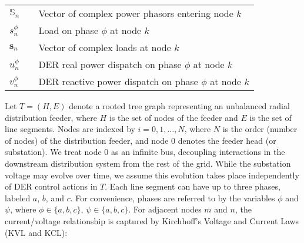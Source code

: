 \begin{table}[t]
\begin{center}
\begin{tabulary}{\textwidth}{LLL}
\noindent $\mathbb{S}_{n}$ & & Vector of complex power phasors entering node $k$ \\
\noindent $s_{n}^{\phi}$ & & Load on phase $\phi$ at node $k$ \\
\noindent $\mathbf{s}_{n}$ & & Vector of complex loads at node $k$ \\
\noindent $u_{n}^{\phi}$ & & DER real power dispatch on phase $\phi$ at node $k$ \\
\noindent $v_{n}^{\phi}$ & & DER reactive power dispatch on phase $\phi$ at node $k$ \\
  \hline
\end{tabulary}  
\end{center}
\end{table}

Let $T = (H,E)$ denote a rooted tree graph representing an unbalanced radial distribution feeder, where $H$ is the set of nodes of the feeder and $E$ is the set of line segments.  Nodes are indexed by $i = 0,1,\dots,N$, where $N$ is the order (number of nodes) of the distribution feeder, and node 0 denotes the feeder head (or substation).  We treat node 0 as an infinite bus, decoupling interactions in the downstream distribution system from the rest of the grid.  While the substation voltage may evolve over time, we assume this evolution takes place independently of DER control actions in $T$.  Each line segment can have up to three phases, labeled $a$, $b$, and $c$.  For convenience, phases are referred to by the variables $\phi$ and $\psi$, where $\phi \in \{a,b,c \}$, $\psi \in \{a,b,c \}$.  For adjacent nodes $m$ and $n$, the current/voltage relationship is captured by Kirchhoff's Voltage and Current Laws (KVL and KCL):

